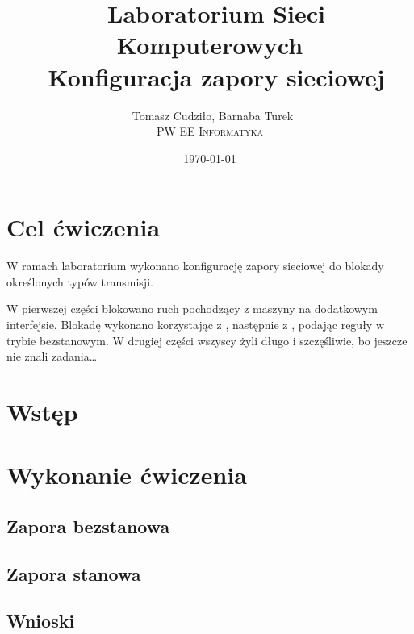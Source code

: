 \documentclass[a4paper,10pt,notitlepage]{article}
\begin{document}
\title{\
Laboratorium Sieci Komputerowych\\\
Konfiguracja zapory sieciowej
}
\author{\
Tomasz Cudziło, Barnaba Turek\\
\textsc{PW EE Informatyka}\\[6pt]
}
\date{\today}

\maketitle
\tableofcontents


\section{Cel ćwiczenia}

W ramach laboratorium wykonano konfigurację zapory sieciowej do blokady
określonych typów transmisji.

W pierwszej części blokowano ruch \ssh{} pochodzący z maszyny \volt{} na
dodatkowym interfejsie. Blokadę wykonano korzystając z \pf, następnie z \ipfw,
podając reguły w trybie bezstanowym. W drugiej części wszyscy żyli długo i
szczęśliwie, bo jeszcze nie znali zadania\dots

\section{Wstęp}
\label{sec:wstep}

\section{Wykonanie ćwiczenia}
\subsection{Zapora bezstanowa}
\label{sec:bezstanowe}

\subsection{Zapora stanowa}
\label{sec:stanowe}

\subsection{Wnioski}




\end{document}
